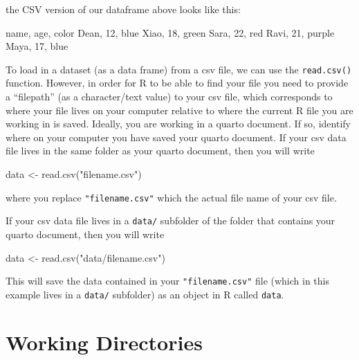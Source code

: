 \documentclass[
  letterpaper,
  DIV=11,
  numbers=noendperiod]{scrreprt}
\newenvironment{Shaded}{\begin{snugshade}}{\end{snugshade}}
\newcommand{\FunctionTok}[1]{\textcolor[rgb]{0.28,0.35,0.67}{#1}}
\newcommand{\NormalTok}[1]{\textcolor[rgb]{0.00,0.23,0.31}{#1}}
\newcommand{\OtherTok}[1]{\textcolor[rgb]{0.00,0.23,0.31}{#1}}
\newcommand{\StringTok}[1]{\textcolor[rgb]{0.13,0.47,0.30}{#1}}
\begin{document}
the CSV version of our dataframe above looks like this:

\begin{Shaded}
\begin{Highlighting}[]
\NormalTok{name, age, color}
\NormalTok{Dean, 12, blue}
\NormalTok{Xiao, 18, green}
\NormalTok{Sara,  22, red}
\NormalTok{Ravi, 21, purple}
\NormalTok{Maya, 17, blue}
\end{Highlighting}
\end{Shaded}

To load in a dataset (as a data frame) from a csv file, we can use the
\texttt{read.csv()} function. However, in order for R to be able to find
your file you need to provide a ``filepath'' (as a character/text value)
to your csv file, which corresponds to where your file lives on your
computer relative to where the current R file you are working in is
saved. Ideally, you are working in a quarto document. If so, identify
where on your computer you have saved your quarto document. If your csv
data file lives in the same folder as your quarto document, then you
will write

\begin{Shaded}
\begin{Highlighting}[]
\NormalTok{data }\OtherTok{\textless{}{-}} \FunctionTok{read.csv}\NormalTok{(}\StringTok{"filename.csv"}\NormalTok{)}
\end{Highlighting}
\end{Shaded}

where you replace \texttt{"filename.csv"} which the actual file name of
your csv file.

If your csv data file lives in a \texttt{data/} subfolder of the folder
that contains your quarto document, then you will write

\begin{Shaded}
\begin{Highlighting}[]
\NormalTok{data }\OtherTok{\textless{}{-}} \FunctionTok{read.csv}\NormalTok{(}\StringTok{"data/filename.csv"}\NormalTok{)}
\end{Highlighting}
\end{Shaded}

This will save the data contained in your \texttt{"filename.csv"} file
(which in this example lives in a \texttt{data/} subfolder) as an object
in R called \texttt{data}.

\section{Working Directories}\label{working-directories}
\end{document}
